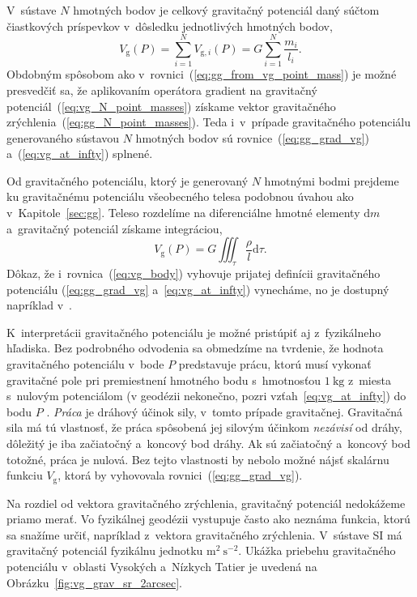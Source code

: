\documentclass[a4paper, 12pt]{book}
\newcommand{\diff}{\mathrm d}
\newcommand{\gidx}{\mathrm g}
\begin{document}
V~sústave $N$ hmotných bodov je celkový gravitačný potenciál daný súčtom
čiastkových príspevkov v~dôsledku jednotlivých hmotných bodov,
%
\begin{equation}
\label{eq:vg_N_point_masses}
V_\gidx(P) = \sum_{i = 1}^{N} V_{\gidx,i}(P) = G \sum_{i = 1}^{N}\frac{
m_i}{l_i}{.}
\end{equation}
%
Obdobným spôsobom ako v~rovnici~(\ref{eq:gg_from_vg_point_mass}) je možné
presvedčiť sa, že aplikovaním operátora gradient na gravitačný
potenciál~(\ref{eq:vg_N_point_masses}) získame vektor gravitačného
zrýchlenia~(\ref{eq:gg_N_point_masses}).  Teda i~v~prípade gravitačného
potenciálu generovaného sústavou $N$ hmotných bodov sú
rovnice~(\ref{eq:gg_grad_vg}) a~(\ref{eq:vg_at_infty}) splnené.

Od gravitačného potenciálu, ktorý je generovaný $N$ hmotnými bodmi prejdeme ku
gravitačnému potenciálu všeobecného telesa podobnou úvahou ako
v~Kapitole~\ref{sec:gg}.  Teleso rozdelíme na diferenciálne hmotné elementy
$\diff m$ a~gravitačný potenciál získame integráciou,
%
\begin{equation}
\label{eq:vg_body}
V_\gidx(P) = G \iiint_{\tau} \frac{\rho}{l} \diff\tau{.}
\end{equation}
%
Dôkaz, že i~rovnica~(\ref{eq:vg_body}) vyhovuje prijatej definícii gravitačného
potenciálu (\ref{eq:gg_grad_vg} a~\ref{eq:vg_at_infty}) vynecháme, no je
dostupný napríklad v~\cite{MacMillan1930}.

K~interpretácii gravitačného potenciálu je možné pristúpiť aj z~fyzikálneho
hľadiska.  Bez podrobného odvodenia sa obmedzíme na tvrdenie, že hodnota
gravitačného potenciálu v~bode $P$ predstavuje prácu, ktorú musí vykonať
gravitačné pole pri premiestnení hmotného bodu s~hmotnosťou $1\ \mathrm{kg}$
z~miesta s~nulovým potenciálom (v geodézii nekonečno, pozri
vzťah~\ref{eq:vg_at_infty}) do bodu $P$
\citep{MacMillan1930,Kellogg1967,TorgeGeodesy}.  \emph{Práca} je dráhový účinok
sily, v~tomto prípade gravitačnej.  Gravitačná sila má tú vlastnosť, že práca
spôsobená jej silovým účinkom \emph{nezávisí} od dráhy, dôležitý je iba
začiatočný a~koncový bod dráhy.  Ak sú začiatočný a~koncový bod totožné, práca
je nulová.  Bez tejto vlastnosti by nebolo možné nájsť skalárnu funkciu
$V_\gidx$, ktorá by vyhovovala rovnici~(\ref{eq:gg_grad_vg}).

Na rozdiel od vektora gravitačného zrýchlenia, gravitačný potenciál nedokážeme
priamo merať.  Vo fyzikálnej geodézii vystupuje často ako neznáma funkcia,
ktorú sa snažíme určiť, napríklad z~vektora gravitačného zrýchlenia.  V~sústave
SI má gravitačný potenciál fyzikálnu jednotku $\mathrm{m}^2\ \mathrm{s}^{-2}$.
Ukážka priebehu gravitačného potenciálu v~oblasti Vysokých a~Nízkych Tatier je
uvedená na Obrázku~\ref{fig:vg_grav_sr_2arcsec}.
\end{document}
